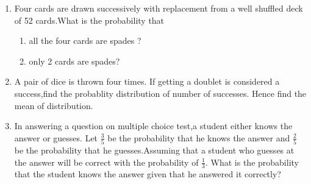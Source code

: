 \begin{enumerate}
\item Four cards are drawn successively with replacement from a well shuffled deck of 52 cards.What is the probability that\\
\begin{enumerate}
\item all the four cards are spades ?\\
\item only 2 cards are spades?
\end{enumerate}
\item A pair of dice is thrown four times. If getting a doublet is considered a success,find the probablity distribution of number of successes. Hence find the mean of distribution.


\item In answering a question on multiple choice test,a student either knows the answer or guesses. Let $\frac{3}{5}$ be the probability that he knows the answer and $\frac{2}{5}$ be the probability that he guesses.Assuming that a student who guesses at the answer will be correct with the probability of $\frac{1}{3}$. What is the probability that the student knows the answer given that he answered it correctly?
\end{enumerate}

